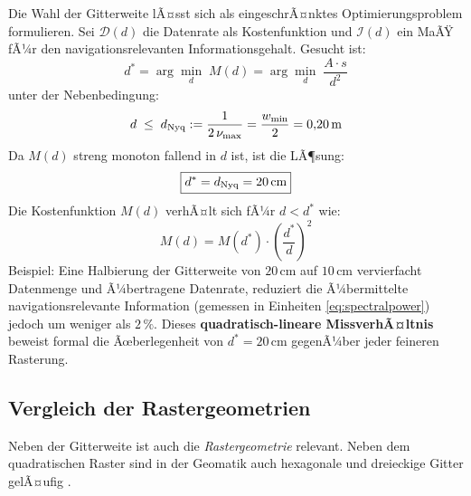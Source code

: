 ﻿\documentclass[a4paper,12pt]{article}
\theoremstyle{definition}
\begin{document}
Die Wahl der Gitterweite lÃ¤sst sich als eingeschrÃ¤nktes
Optimierungsproblem formulieren. Sei $\mathcal{D}(d)$ die Datenrate
als Kostenfunktion und $\mathcal{I}(d)$ ein MaÃŸ fÃ¼r den
navigationsrelevanten Informationsgehalt. Gesucht ist:
\begin{equation}
  d^* = \arg\min_{d}\; M(d) = \arg\min_{d}\; \frac{A \cdot s}{d^2}
  \label{eq:opt_ziel}
\end{equation}
unter der Nebenbedingung:
\begin{equation}
  d \;\leq\; d_{\rm Nyq} := \frac{1}{2\,\nu_{\max}}
  = \frac{w_{\min}}{2} = 0{,}20\,\text{m}
  \label{eq:opt_neb}
\end{equation}
Da $M(d)$ streng monoton fallend in $d$ ist, ist die LÃ¶sung:
\begin{equation}
  \boxed{d^* = d_{\rm Nyq} = 20\,\text{cm}}
  \label{eq:opt_loesung}
\end{equation}
Die Kostenfunktion $M(d)$ verhÃ¤lt sich fÃ¼r $d < d^*$ wie:
\begin{equation}
  M(d) = M(d^*) \cdot \left(\frac{d^*}{d}\right)^2
  \label{eq:kostenquadrat}
\end{equation}
Beispiel: Eine Halbierung der Gitterweite von $20\,\text{cm}$ auf
$10\,\text{cm}$ vervierfacht Datenmenge und Ã¼bertragene Datenrate,
reduziert die Ã¼bermittelte navigationsrelevante Information
(gemessen in Einheiten \eqref{eq:spectralpower}) jedoch um weniger
als $2\,\%$. Dieses \textbf{quadratisch-lineare MissverhÃ¤ltnis}
beweist formal die Ãœberlegenheit von $d^* = 20\,\text{cm}$
gegenÃ¼ber jeder feineren Rasterung.

\subsection{Vergleich der Rastergeometrien}

Neben der Gitterweite ist auch die \emph{Rastergeometrie} relevant.
Neben dem quadratischen Raster sind in der Geomatik auch
hexagonale und dreieckige Gitter gelÃ¤ufig \cite{sahr2003}.
\end{document}
